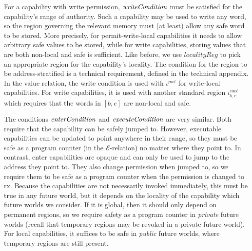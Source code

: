 \documentclass[compsoc,conference,letterpaper,fleqn]{IEEEtran}
\newcommand{\var}[1]{\mathit{#1}}
\newcommand{\start}{\var{b}}
\newcommand{\addrend}{\var{e}}
\newcommand{\nwl}{\var{nwl}}
\newcommand{\pwl}{\var{pwl}}
\newcommand{\plainfun}[2]{
  \ifthenelse{\equal{#2}{}}
  {\mathit{#1}}
  {\mathit{#1}(#2)}
}
\newcommand{\writeCond}[1]{\plainfun{writeCondition}{#1}}
\newcommand{\execCond}[1]{\plainfun{executeCondition}{#1}}
\newcommand{\entryCond}[1]{\plainfun{enterCondition}{#1}}
\newcommand{\asmType}{\plaindom{AsmType}}
\newcommand{\plaindom}[1]{\mathrm{#1}}
\newcommand{\intr}[2]{\mathcal{#1}}
\newcommand{\exprintr}[1]{\intr{E}{#1}}
\newcommand{\stder}{\exprintr{\asmType}}
\newcommand{\plainperm}[1]{\mathrm{#1}}
\newcommand{\exec}{\plainperm{rx}}
\begin{document}
For a capability with write permission, $\writeCond{}$ must be satisfied for the
capability's range of authority. Such a capability may be used to write any
word, so the region governing the relevant memory must (at least) allow any safe
word to be stored. More precisely, for permit-write-local capabilities it needs
to allow arbitrary safe values to be stored, while for write capabilities,
storing values that are both non-local and safe is sufficient. Like before, we
use $\var{localityReg}$ to pick an appropriate region for the capability's
locality. The condition for the region to be address-stratified is a technical
requirement, defined in the technical appendix. In the value relation, the write
condition is used with $\iota^\pwl$ for write-local capabilities. For write
capabilities, it is used with another standard region
$\iota^\nwl_{\start,\addrend}$ which requires that the words in
$[\start,\addrend]$ are non-local and safe.

The conditions $\entryCond{}$ and $\execCond{}$ are very similar. Both require
that the capability can be safely jumped to. However, executable capabilities
can be updated to point anywhere in their range, so they must be safe as a
program counter (in the $\stder$-relation) no matter where they point to. In
contrast, enter capabilities are opaque and can only be used to jump to the
address they point to. They also change permission when jumped to, so we require
them to be safe as a program counter when the permission is changed to $\exec$.
Because the capabilities are not necessarily invoked immediately, this must be
true in any future world, but it depends on the locality of the capability which
future worlds we consider. If it is global, then it should only depend on
permanent regions, so we require safety as a program counter in \emph{private}
future worlds (recall that temporary regions may be revoked in a private future
world). For local capabilities, it suffices to be safe in \emph{public} future
worlds, where temporary regions are still present.
\end{document}

